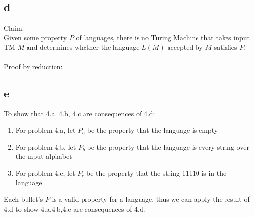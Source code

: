 \documentclass[letterpaper,notitlepage,twoside]{article}
\begin{document}
\subsection*{d}
Claim:\\
Given some property $P$ of languages, there is no Turing Machine that takes input TM $M$ and determines whether the language $L(M)$ accepted by $M$ satisfies $P$.\\\\
Proof by reduction:\\

\subsection*{e}
To show that 4.a, 4.b, 4.c are consequences of 4.d:
\begin{enumerate}
\item For problem 4.a, let $P_a$ be the property that the language is empty
\item For problem 4.b, let $P_b$ be the property that the language is every string over the input alphabet
\item For problem 4.c, let $P_c$ be the property that the string 11110 is in the language
\end{enumerate}
Each bullet's $P$ is a valid property for a language, thus we can apply the result of 4.d to show 4.a,4.b,4.c are consequences of 4.d.
\end{document}
